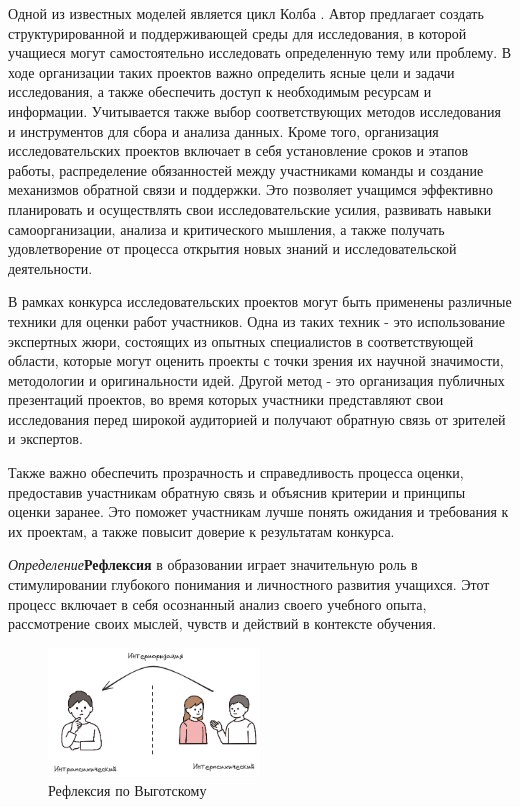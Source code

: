 Одной из известных моделей является цикл Колба \cite{kolb2014experiential}. Автор предлагает 
создать структурированной и поддерживающей среды для исследования, в которой учащиеся могут самостоятельно исследовать определенную тему или проблему. 
В ходе организации таких проектов важно определить ясные цели и задачи исследования, а также обеспечить доступ к необходимым ресурсам и информации. Учитывается также выбор соответствующих методов исследования и инструментов для сбора и анализа данных. Кроме того, организация исследовательских проектов включает в себя установление сроков и этапов работы, распределение обязанностей между участниками команды и создание механизмов обратной связи и поддержки. Это позволяет учащимся эффективно планировать и осуществлять свои исследовательские усилия, развивать навыки самоорганизации, анализа и критического мышления, а также получать удовлетворение от процесса открытия новых знаний и исследовательской деятельности.

В рамках конкурса исследовательских проектов могут быть применены различные техники для оценки работ участников. Одна из таких техник - это использование экспертных жюри, состоящих из опытных специалистов в соответствующей области, которые могут оценить проекты с точки зрения их научной значимости, методологии и оригинальности идей. 
Другой метод - это организация публичных презентаций проектов, во время которых участники представляют свои исследования перед широкой аудиторией и получают обратную связь от зрителей и экспертов.

Также важно обеспечить прозрачность и справедливость процесса оценки, предоставив участникам обратную связь и объяснив критерии и принципы оценки заранее. Это поможет участникам лучше понять ожидания и требования к их проектам, а также повысит доверие к результатам конкурса.

\textit{Определение}\textbf{Рефлексия} в образовании играет значительную роль в 
стимулировании глубокого понимания и личностного развития учащихся. 
Этот процесс включает в себя осознанный анализ своего учебного опыта, 
рассмотрение своих мыслей, чувств и действий в контексте обучения.


\begin{figure}[h]
    \centering
    \includegraphics[width=0.5\textwidth]{assets/pedagogic/psy/reflection.excalidraw.png}
    \caption{Рефлексия по Выготскому \cite{выготский2014мышление}}
    \label{reflection}
\end{figure}

